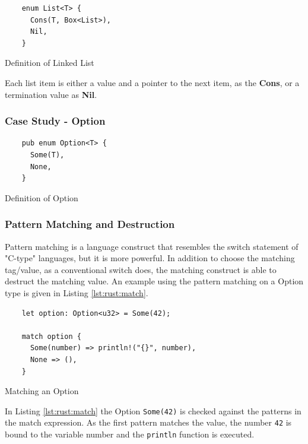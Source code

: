\begin{listing}[H]
  \begin{verbatim}
    enum List<T> {
      Cons(T, Box<List>),
      Nil,
    }
  \end{verbatim}
  \caption{Definition of Linked List}
  \label{lst:rust:list}
\end{listing}

Each list item is either a value and a pointer to the next item, as the \textbf{Cons}, or a termination value as \textbf{Nil}.

\subsubsection{Case Study - Option}

\begin{listing}[H]
  \begin{verbatim}
    pub enum Option<T> {
      Some(T),
      None,
    }
  \end{verbatim}
  \caption{Definition of Option}
  \label{lst:rust:option}
\end{listing}

\subsubsection{Pattern Matching and Destruction}

Pattern matching is a language construct that resembles the switch statement of "C-type" languages, but it is more powerful.
In addition to choose the matching tag/value, as a conventional switch does, the matching construct is able to destruct the matching value.
An example using the pattern matching on a Option type is given in Listing \ref{lst:rust:match}.

\begin{listing}[H]
  \begin{verbatim}
    let option: Option<u32> = Some(42);

    match option {
      Some(number) => println!("{}", number),
      None => (),
    }
  \end{verbatim}
  \caption{Matching an Option}
  \label{lst:rust:match}
\end{listing}

In Listing \ref{lst:rust:match} the Option \texttt{Some(42)} is checked against the patterns in the match expression.
As the first pattern matches the value, the number \texttt{42} is bound to the variable number and the \texttt{println} function is executed.

